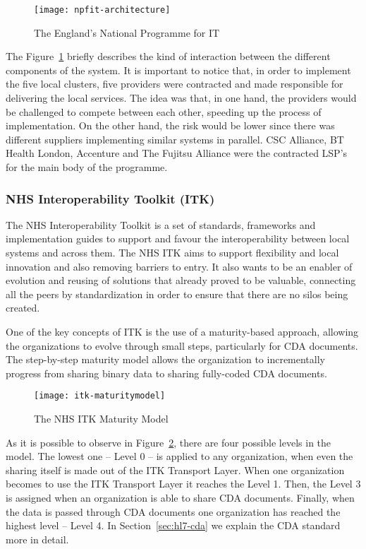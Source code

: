 \begin{figure}[t]
\centering
\texttt{[image: npfit-architecture]}
\caption[The England's National Programme for IT]{The England's National Programme for IT~\citep{Brennan2005}}
\label{fig:npfit-architecture}
\end{figure}

The Figure~\ref{fig:npfit-architecture} briefly describes the kind of interaction between the different components of the system. It is important to notice that, in order to implement the five local clusters, five providers were contracted and made responsible for delivering the local services. The idea was that, in one hand, the providers would be challenged to compete between each other, speeding up the process of implementation. On the other hand, the risk would be lower since there was different suppliers implementing similar systems in parallel. CSC Alliance, BT Health London, Accenture and The Fujitsu Alliance were the contracted LSP's for the main body of the programme.


\subsubsection{NHS Interoperability Toolkit (ITK)}
The NHS Interoperability Toolkit is a set of standards, frameworks and implementation guides to support and favour the interoperability between local systems and across them. The NHS ITK aims to support flexibility and local innovation and also removing barriers to entry. It also wants to be an enabler of evolution and reusing of solutions that already proved to be valuable, connecting all the peers by standardization in order to ensure that there are no silos being created.

One of the key concepts of ITK is the use of a maturity-based approach, allowing the organizations to evolve through small steps, particularly for CDA documents. The step-by-step maturity model allows the organization to incrementally progress from sharing binary data to sharing fully-coded CDA documents.

\begin{figure}[h]
\centering
\texttt{[image: itk-maturitymodel]}
\caption[The NHS ITK Maturity Model]{The NHS ITK Maturity Model~\citep{Health2012}}
\label{fig:npfit-itk}
\end{figure}

As it is possible to observe in Figure~\ref{fig:npfit-itk}, there are four possible levels in the model. The lowest one -- Level 0 -- is applied to any organization, when even the sharing itself is made out of the ITK Transport Layer. When one organization becomes to use the ITK Transport Layer it reaches the Level 1. Then, the Level 3 is assigned when an organization is able to share CDA documents. Finally, when the data is passed through CDA documents one organization has reached the highest level -- Level 4. In Section~\ref{sec:hl7-cda} we explain the CDA standard more in detail.


